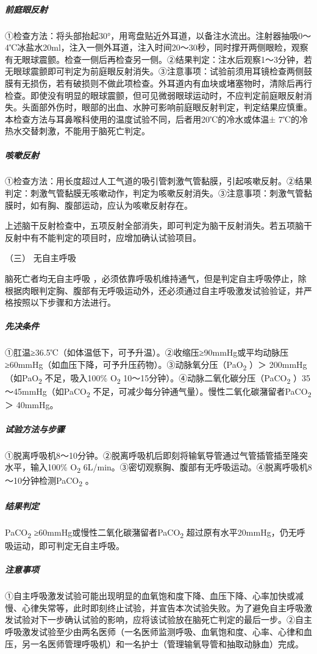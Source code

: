 \subparagraph{前庭眼反射}

①检查方法：将头部抬起30°，用弯盘贴近外耳道，以备注水流出。注射器抽吸0～4℃冰盐水20ml，注入一侧外耳道，注入时间20～30秒，同时撑开两侧眼睑，观察有无眼球震颤。检查一侧后再检查另一侧。②结果判定：注水后观察1～3分钟，若无眼球震颤即可判定为前庭眼反射消失。③注意事项：试验前须用耳镜检查两侧鼓膜有无损伤，若有破损则不做此项检查。外耳道内有血块或堵塞物时，清除后再行检查。即使没有明显的眼球震颤，但可见微弱眼球运动时，不应判定前庭眼反射消失。头面部外伤时，眼部的出血、水肿可影响前庭眼反射判定，判定结果应慎重。本检查方法与耳鼻喉科使用的温度试验不同，后者用20℃的冷水或体温±
7℃的冷热水交替刺激，不能用于脑死亡判定。

\subparagraph{咳嗽反射}

①检查方法：用长度超过人工气道的吸引管刺激气管黏膜，引起咳嗽反射。②结果判定：刺激气管黏膜无咳嗽动作，判定为咳嗽反射消失。③注意事项：刺激气管黏膜时，如有胸、腹部运动，应认为咳嗽反射存在。

上述脑干反射检查中，五项反射全部消失，即可判定为脑干反射消失。若五项脑干反射中有不能判定的项目时，应增加确认试验项目。

\hypertarget{text00069.htmlux5cux23CHP3-1-5-2-3}{}
（三） 无自主呼吸

脑死亡者均无自主呼吸
，必须依靠呼吸机维持通气，但是判定自主呼吸停止，除根据肉眼判定胸、腹部有无呼吸运动外，还必须通过自主呼吸激发试验验证，并严格按照以下步骤和方法进行。

\subparagraph{先决条件}

①肛温≥36.5℃（如体温低下，可予升温）。②收缩压≥90mmHg或平均动脉压≥60mmHg（如血压下降，可予升压药物）。③动脉氧分压（PaO\textsubscript{2}
）＞ 200mmHg（如PaO\textsubscript{2} 不足，吸入100\% O\textsubscript{2}
10～15分钟）。④动脉二氧化碳分压（PaCO\textsubscript{2}
）35～45mmHg（如PaCO\textsubscript{2}
不足，可减少每分钟通气量）。慢性二氧化碳潴留者PaCO\textsubscript{2} ＞
40mmHg。

\subparagraph{试验方法与步骤}

①脱离呼吸机8～10分钟。②脱离呼吸机后即刻将输氧导管通过气管插管插至隆突水平，输入100\%
O\textsubscript{2}
6L/min。③密切观察胸、腹部有无呼吸运动。④脱离呼吸机8～10分钟检测PaCO\textsubscript{2}
。

\subparagraph{结果判定}

PaCO\textsubscript{2} ≥60mmHg或慢性二氧化碳潴留者PaCO\textsubscript{2}
超过原有水平20mmHg，仍无呼吸运动，即可判定无自主呼吸。

\subparagraph{注意事项}

①自主呼吸激发试验可能出现明显的血氧饱和度下降、血压下降、心率加快或减慢、心律失常等，此时即刻终止试验，并宣告本次试验失败。为了避免自主呼吸激发试验对下一步确认试验的影响，应将该试验放在脑死亡判定的最后一步。②自主呼吸激发试验至少由两名医师（一名医师监测呼吸、血氧饱和度、心率、心律和血压，另一名医师管理呼吸机）和一名护士（管理输氧导管和抽取动脉血）完成。

